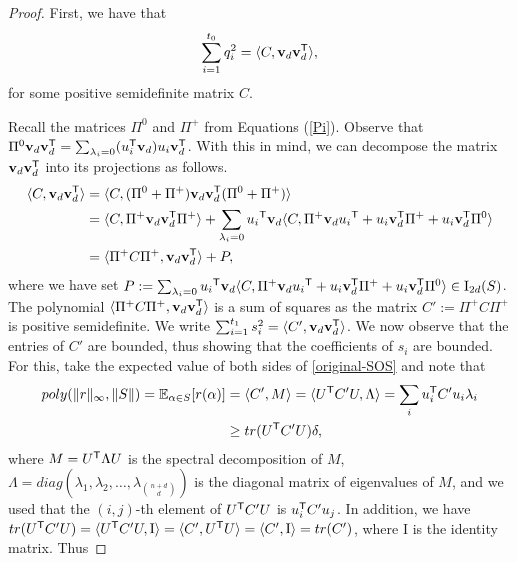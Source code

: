 \documentclass[11pt]{article}
\newcommand{\I}{\emph{$\rm{I}$}}
\newcommand{\1}{\textbf{1}}
\begin{document}
\begin{proof}
    First, we have that
    \begin{equation}
        \sum_{i=1}^{t_0} q_i^2 = \langle C, \mathbf{v}_d \mathbf{v}_d^{\sf{T}} \rangle,
    \end{equation}
    for some positive semidefinite matrix $C$.
    
    Recall the matrices $\Pi^0$ and $\Pi^+$ from Equations (\ref{Pi}). Observe that $\Pi^0 \mathbf{v}_d \mathbf{v}_d^{\sf{T}} = \sum_{\lambda_i = 0} (u_i^{\sf{T}} \mathbf{v}_d ) u_i \mathbf{v}_d^{\sf{T}}$. With this in mind, we can decompose the matrix $\mathbf{v}_d \mathbf{v}_d^{\sf{T}}$ into its projections as follows.
    \begin{align*}
        \langle C, \mathbf{v}_d \mathbf{v}_d^{\sf{T}} \rangle &= \langle C, (\Pi^0 + \Pi^+) \mathbf{v}_d \mathbf{v}_d^{\sf{T}} (\Pi^0 + \Pi^+) \rangle \\
        &= \langle C, \Pi^+ \mathbf{v}_d \mathbf{v}_d^{\sf{T}} \Pi^+ \rangle + \sum_{\lambda_i = 0} {u_i}^{\sf{T}} \mathbf{v}_d \langle C, \Pi^+ \mathbf{v}_d {u_i}^{\sf{T}} + {u_i} \mathbf{v}_d^{\sf{T}} \Pi^+ + {u_i} \mathbf{v}_d^{\sf{T}} \Pi^0 \rangle\\
        & = \langle \Pi^+ C \Pi^+, \mathbf{v}_d \mathbf{v}_d^{\sf{T}} \rangle + P,
    \end{align*}
    where we have set $P := \sum_{\lambda_i = 0} {u_i}^{\sf{T}} \mathbf{v}_d \langle C, \Pi^+ \mathbf{v}_d {u_i}^{\sf{T}} + {u_i} \mathbf{v}_d^{\sf{T}} \Pi^+ + {u_i} \mathbf{v}_d^{\sf{T}} \Pi^0 \rangle \in \I_{2d}(S)$. The polynomial $\langle \Pi^+ C \Pi^+, \mathbf{v}_d \mathbf{v}_d^{\sf{T}} \rangle$ is a sum of squares as the matrix $C':= \Pi^+ C \Pi^+$ is positive semidefinite. We write $\sum_{i=1}^{t_1}s_i^2 = \langle  C', \mathbf{v}_d \mathbf{v}_d^{\sf{T}} \rangle $. We now observe that the entries of $C'$ are bounded, thus showing that the coefficients of $s_i$ are bounded. For this, take the expected value of both sides of \eqref{original-SOS} and note that
    \begin{align*}
        poly(\| r \|_{\infty}, \| S \|)=\mathbb{E}_{\alpha \in S} [r(\alpha)] &= \langle C', M \rangle = \langle U^{\sf{T}} C' U, \Lambda \rangle = \sum_i u_i^{\sf{T}} C' u_i \lambda_i\\
        &\geq tr(U^{\sf{T}} C' U) \delta,
    \end{align*}
    where $M = U^{\sf{T}} \Lambda U$ is the spectral decomposition of $M$, $\Lambda = diag(\lambda_1, \lambda_2, \dots, \lambda_{\binom{n+d}{d}})$ is the diagonal matrix of eigenvalues of $M$, and we used that the $(i,j)$-th element of $U^{\sf{T}} C' U$ is $u_i^{\sf{T}} C' u_j$. In addition, we have $tr(U^{\sf{T}} C' U) = \langle U^{\sf{T}} C' U, \mathrm{I} \rangle = \langle C', U^{\sf{T}} U \rangle =  \langle C', \mathrm{I} \rangle = tr(C')$, where $\mathrm{I}$ is the identity matrix. Thus

\end{proof}
\end{document}
